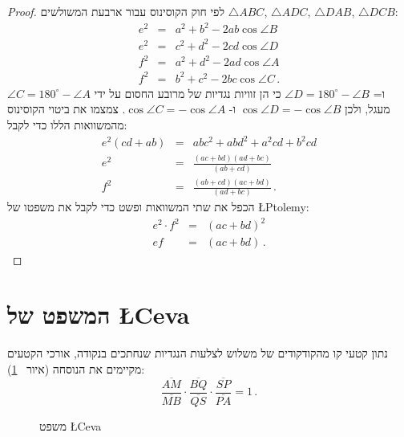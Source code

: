 \begin{proof}
לפי חוק הקוסינוס עבור ארבעת המשולשים
$\triangle ABC$, $\triangle ADC$, $\triangle DAB$, $\triangle DCB$:
\begin{eqnarray*}
e^2 &=& a^2 + b^2 - 2ab \cos \angle B\\
e^2 &=& c^2 + d^2 - 2cd \cos \angle D\\
f^2 &=& a^2 + d^2 - 2ad \cos \angle A\\
f^2 &=& b^2 + c^2 - 2bc \cos \angle C\,.
\end{eqnarray*}
$\angle C = 180^\circ - \angle A$
ו=%
$\angle D = 180^\circ - \angle B$
כי הן זוויות נגדיות של מרובע החסום על ידי מעגל, ולכן
$\cos \angle D = - \cos \angle B$
ו-%
$\cos \angle C = -\cos \angle A$.
צמצמו את ביטוי הקוסינוס מהמשוואות הללו כדי לקבל:
\begin{eqnarray*}
e^2(cd+ab)&=&abc^2+abd^2+a^2cd+b^2cd\\
e^2 &=& \frac{(ac+bd)(ad+bc)}{(ab+cd)}\\
f^2 &=& \frac{(ab+cd)(ac+bd)}{(ad+bc)}\,.
\end{eqnarray*}
הכפל את שתי המשוואות ופשט כדי לקבל את משפטו של
\L{Ptolemy}:
\begin{eqnarray*}
e^2\cdot f^2 &=& (ac+bd)^2\\
ef &=& (ac+bd)\,.
\end{eqnarray*}
\end{proof}


\section{המשפט של \L{Ceva}}\label{a.ceva}

\begin{theorem}[Ceva]
נתון קטעי קו מהקודקודים של משלוש לצלעות הנגדיות שנחתכים בנקודה, אורכי הקטעים מקיימים את הנוסחה (איור%
~\ref{f.ceva1}):
\[
\frac{\overline{AM}}{\overline{MB}}\cdot\frac{\overline{BQ}}{\overline{QS}}\cdot\frac{\overline{SP}}{\overline{PA}} = 1\,.
\]
\end{theorem}

\begin{figure}[b]
\begin{center}
\end{center}
\caption{משפט \L{Ceva}}\label{f.ceva1}
\end{figure}

